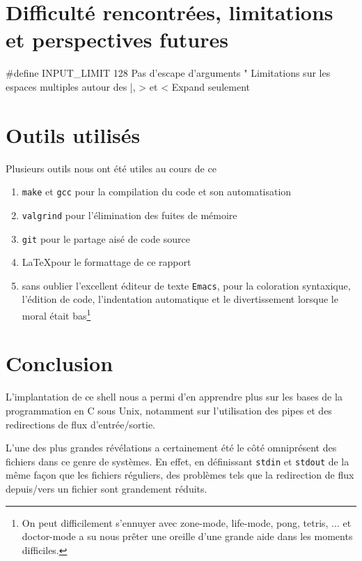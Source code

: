 \documentclass{article}
\begin{document}
\section{Difficulté rencontrées, limitations et perspectives futures}

\#define INPUT\_LIMIT 128
Pas d'escape d'arguments "
Limitations sur les espaces multiples autour des |, > et <
Expand seulement



\section{Outils utilisés}

Plusieurs outils nous ont été utiles au cours de ce

\begin{enumerate}
\item \texttt{make} et \texttt{gcc} pour la compilation du code et son automatisation
\item \texttt{valgrind} pour l'élimination des fuites de mémoire
\item \texttt{git} pour le partage aisé de code source
\item \LaTeX pour le formattage de ce rapport
\item sans oublier l'excellent éditeur de texte \texttt{Emacs}, pour la coloration syntaxique, l'édition de code, l'indentation automatique et le divertissement lorsque le moral était bas\footnote{On peut difficilement s'ennuyer avec zone-mode, life-mode, pong, tetris, ... et doctor-mode a su nous prêter une oreille d'une grande aide dans les moments difficiles.}
\end{enumerate}

\section{Conclusion}

L'implantation de ce shell nous a permi d'en apprendre plus sur les bases de la programmation en C sous Unix, notamment sur l'utilisation des pipes et des redirections de flux d'entrée/sortie.

L'une des plus grandes révélations a certainement été le côté omniprésent des fichiers dans ce genre de systèmes. En effet, en définissant \texttt{stdin} et \texttt{stdout} de la même façon que les fichiers réguliers, des problèmes tels que la redirection de flux depuis/vers un fichier sont grandement réduits.
\end{document}
